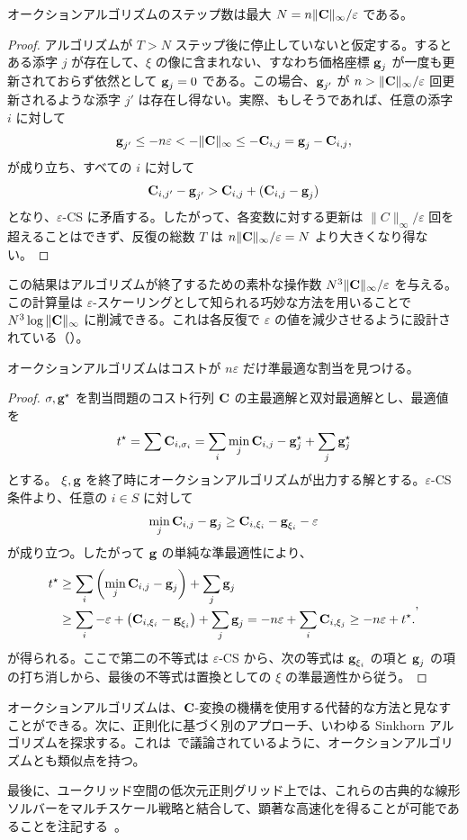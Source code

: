\begin{prop} オークションアルゴリズムのステップ数は最大 $N=n\|\mathrm{\textbf{C}}\|_\infty/\varepsilon$ である。
\end{prop}
\begin{proof}アルゴリズムが $T>N$ ステップ後に停止していないと仮定する。するとある添字 $j$ が存在して、$\xi$ の像に含まれない、すなわち価格座標 $\mathrm{\textbf{g}}_j$ が一度も更新されておらず依然として $\mathrm{\textbf{g}}_j=0$ である。この場合、$\mathrm{\textbf{g}}_{j'}$ が $n>\|\mathrm{\textbf{C}}\|_\infty/\varepsilon$ 回更新されるような添字 $j'$ は存在し得ない。実際、もしそうであれば、任意の添字 $i$ に対して
$$\mathrm{\textbf{g}}_{j'}\leq-n\varepsilon<-\|\mathrm{\textbf{C}}\|_\infty\leq -\mathrm{\textbf{C}}_{i,j} = \mathrm{\textbf{g}}_j-\mathrm{\textbf{C}}_{i,j},$$
が成り立ち、すべての $i$ に対して
$$\mathrm{\textbf{C}}_{i,j'}-\mathrm{\textbf{g}}_{j'}> \mathrm{\textbf{C}}_{i,j}+ (\mathrm{\textbf{C}}_{i,j}-\mathrm{\textbf{g}}_j)$$
となり、$\varepsilon$-CS に矛盾する。したがって、各変数に対する更新は $\|C\|_\infty/\varepsilon$ 回を超えることはできず、反復の総数 $T$ は $n\|\mathrm{\textbf{C}}\|_\infty/\varepsilon=N$ より大きくなり得ない。
\end{proof}

\begin{rem} この結果はアルゴリズムが終了するための素朴な操作数 $N^3\|\mathrm{\textbf{C}}\|_\infty/\varepsilon$ を与える。この計算量は $\varepsilon$-スケーリングとして知られる巧妙な方法を用いることで $N^3 \log\|\mathrm{\textbf{C}}\|_\infty$ に削減できる。これは各反復で $\varepsilon$ の値を減少させるように設計されている（\cite[p. 264]{bertsekas1998network}）。
\end{rem}

\begin{prop} オークションアルゴリズムはコストが $n\varepsilon$ だけ準最適な割当を見つける。
\end{prop}
\begin{proof}
	$\sigma,\mathrm{\textbf{g}}^\star$ を割当問題のコスト行列 $\mathrm{\textbf{C}}$ の主最適解と双対最適解とし、最適値を $$t^\star=\sum \mathrm{\textbf{C}}_{i,\sigma_i} = \sum_i \min_{j}\mathrm{\textbf{C}}_{i,j}-\mathrm{\textbf{g}}^\star_j+\sum_j\mathrm{\textbf{g}}^\star_j$$ とする。
$\xi,\mathrm{\textbf{g}}$ を終了時にオークションアルゴリズムが出力する解とする。$\varepsilon$-CS 条件より、任意の $i\in S$ に対して
$$\min_{j} \mathrm{\textbf{C}}_{i,j} - \mathrm{\textbf{g}}_{j}\geq \mathrm{\textbf{C}}_{i,\xi_i} - \mathrm{\textbf{g}}_{\xi_i} -\varepsilon$$
が成り立つ。したがって $\mathrm{\textbf{g}}$ の単純な準最適性により、
	$$\begin{aligned}t^\star&\geq \sum_i \left(\min_{j} \mathrm{\textbf{C}}_{i,j}-\mathrm{\textbf{g}}_{j}\right) + \sum_j \mathrm{\textbf{g}}_j\\
&\geq
	\sum_i -\varepsilon+\left(\mathrm{\textbf{C}}_{i,\xi_i}-\mathrm{\textbf{g}}_{\xi_i}\right) + \sum_j \mathrm{\textbf{g}}_j = -n\varepsilon + \sum_i \mathrm{\textbf{C}}_{i,\xi_j} \geq  - n\varepsilon + t^\star.\end{aligned},$$
が得られる。ここで第二の不等式は $\varepsilon$-CS から、次の等式は $\mathrm{\textbf{g}}_{\xi_i}$ の項と $\mathrm{\textbf{g}}_{j}$ の項の打ち消しから、最後の不等式は置換としての $\xi$ の準最適性から従う。
\end{proof}


オークションアルゴリズムは、$\mathrm{\textbf{C}}$-変換の機構を使用する代替的な方法と見なすことができる。次に、正則化に基づく別のアプローチ、いわゆる Sinkhorn アルゴリズムを探求する。これは~\citep{schmitzer2016stabilized}で議論されているように、オークションアルゴリズムとも類似点を持つ。

最後に、ユークリッド空間の低次元正則グリッド上では、これらの古典的な線形ソルバーをマルチスケール戦略と結合して、顕著な高速化を得ることが可能であることを注記する~\citep{schmitzer2016sparse,oberman2015efficient}。

